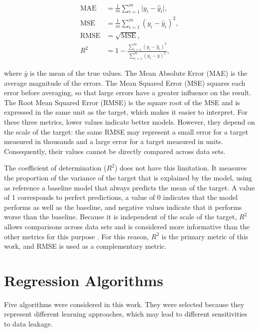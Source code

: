 \begin{align}
  \text{MAE}  &= \frac{1}{m}\sum_{i=1}^{m} \lvert y_i - \hat{y}_i \rvert, \label{eq:mae}\\
  \text{MSE}  &= \frac{1}{m}\sum_{i=1}^{m} (y_i - \hat{y}_i)^2, \label{eq:mse}\\
  \text{RMSE} &= \sqrt{\text{MSE}}, \label{eq:rmse}\\
  R^2         &= 1 - \frac{\sum_{i=1}^{m} (y_i - \hat{y}_i)^2}{\sum_{i=1}^{m} (y_i - \bar{y})^2}, \label{eq:r2}
\end{align}

\noindent where $\bar{y}$ is the mean of the true values. The Mean Absolute Error
(MAE) is the average magnitude of the errors. The Mean Squared Error (MSE)
squares each error before averaging, so that large errors have a greater
influence on the result. The Root Mean Squared Error (RMSE) is the square root of
the MSE and is expressed in the same unit as the target, which makes it easier
to interpret. For these three metrics, lower values indicate better models.
However, they depend on the scale of the target: the same RMSE may represent a
small error for a target measured in thousands and a large error for a target
measured in units. Consequently, their values cannot be directly compared across
data sets.

The coefficient of determination ($R^2$) does not have this limitation. It
measures the proportion of the variance of the target that is explained by the
model, using as reference a baseline model that always predicts the mean of the
target. A value of 1 corresponds to perfect predictions, a value of 0 indicates
that the model performs as well as the baseline, and negative values indicate
that it performs worse than the baseline. Because it is independent of the scale
of the target, $R^2$ allows comparisons across data sets and is considered more
informative than the other metrics for this purpose \cite{chicco2021}. For this
reason, $R^2$ is the primary metric of this work, and RMSE is used as a
complementary metric.

\section{Regression Algorithms}
\label{sec:fund-algoritmos}

Five algorithms were considered in this work. They were selected because they
represent different learning approaches, which may lead to different
sensitivities to data leakage.

